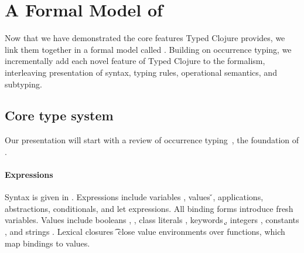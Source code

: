 \section{A Formal Model of \lambdatc{}}

\label{sec:formal}

Now that we have demonstrated the core features Typed Clojure
provides, we link them together in a formal model called
\lambdatc{}.
%
Building on occurrence typing,
we incrementally add each
novel feature of Typed Clojure to the formalism,
interleaving presentation of syntax, typing rules, operational semantics,
and subtyping.

\subsection{Core type system}
\label{sec:coretypesystem}

Our presentation will start with a review of
occurrence typing~\cite{TF10}, the foundation of \lambdatc{}.

\paragraph{Expressions} Syntax is given in . Expressions \e{} 
include variables \x{}, values \v{},
applications, abstractions, conditionals, and let expressions.
All binding forms introduce fresh variables.
Values include booleans \bool{}, \nil{}, class literals {\class{}}, keywords \k{},
integers {\nat{}},
constants {\const{}}, and strings \str{}. Lexical closures {\closure {\openv{}} {\abs {\x{}} {\t{}} {\e{}}}}
close value environments \openv{} over functions, which map bindings to values.

